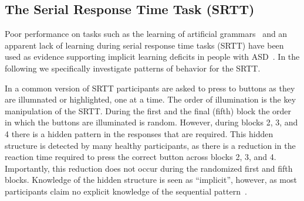 \subsection{The Serial Response Time Task (SRTT)}
Poor performance on tasks such as the learning of artificial grammars~\cite{RefWorks:147} and an apparent lack of learning during serial response time tasks (SRTT) have been used as evidence supporting implicit learning deficits in people with ASD~\cite{RefWorks:148,RefWorks:149}.  In the following we specifically investigate patterns of behavior for the SRTT.


In a common version of SRTT participants are asked to press to buttons as they are illumnated or highlighted, one at a time.  The order of illumination is the key manipulation of the SRTT. During the first and the final (fifth) block the order in which the buttons are illuminated is random.  However, during blocks 2, 3, and 4 there is a hidden pattern in the responses that are required.  This hidden structure is detected by many healthy participants, as there is a reduction in the reaction time required to press the correct button across blocks 2, 3, and 4.  Importantly, this reduction does not occur during the randomized first and fifth blocks.  Knowledge of the hidden structure is seen as ``implicit'', however, as most participants claim no explicit knowledge of the sequential pattern~\cite{Cleeremans:1991:SSRT}.

